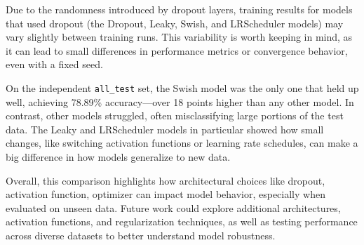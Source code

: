 \documentclass{article}      %
\begin{document}
Due to the randomness introduced by dropout layers, training results for models that used dropout (the Dropout, Leaky, Swish, and LRScheduler models) may vary slightly between training runs. This variability is worth keeping in mind, as it can lead to small differences in performance metrics or convergence behavior, even with a fixed seed.

On the independent \texttt{all\_test} set, the Swish model was the only one that held up well, achieving 78.89\% accuracy---over 18 points higher than any other model. In contrast, other models struggled, often misclassifying large portions of the test data. The Leaky and LRScheduler models in particular showed how small changes, like switching activation functions or learning rate schedules, can make a big difference in how models generalize to new data.

Overall, this comparison highlights how architectural choices like dropout, activation function, optimizer can impact model behavior, especially when evaluated on unseen data. Future work could explore additional architectures, activation functions, and regularization techniques, as well as testing performance across diverse datasets to better understand model robustness.
\end{document}
